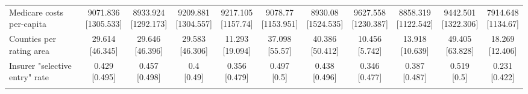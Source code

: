 \begin{tabular}[t]{lcccccccccc}
\addlinespace
Medicare costs per-capita & \makecell[t]{9071.836\\{[}1305.533{]}} & \makecell[t]{8933.924\\{[}1292.173{]}} & \makecell[t]{9209.881\\{[}1304.557{]}} & \makecell[t]{9217.105\\{[}1157.74{]}} & \makecell[t]{9078.77\\{[}1153.951{]}} & \makecell[t]{8930.08\\{[}1524.535{]}} & \makecell[t]{9627.558\\{[}1230.387{]}} & \makecell[t]{8858.319\\{[}1122.542{]}} & \makecell[t]{9442.501\\{[}1322.306{]}} & \makecell[t]{7914.648\\{[}1134.67{]}}\\
\addlinespace
Counties per rating area & \makecell[t]{29.614\\{[}46.345{]}} & \makecell[t]{29.646\\{[}46.396{]}} & \makecell[t]{29.583\\{[}46.306{]}} & \makecell[t]{11.293\\{[}19.094{]}} & \makecell[t]{37.098\\{[}55.57{]}} & \makecell[t]{40.386\\{[}50.412{]}} & \makecell[t]{10.456\\{[}5.742{]}} & \makecell[t]{13.918\\{[}10.639{]}} & \makecell[t]{49.405\\{[}63.828{]}} & \makecell[t]{18.269\\{[}12.406{]}}\\
\addlinespace
Insurer "selective entry" rate & \makecell[t]{0.429\\{[}0.495{]}} & \makecell[t]{0.457\\{[}0.498{]}} & \makecell[t]{0.4\\{[}0.49{]}} & \makecell[t]{0.356\\{[}0.479{]}} & \makecell[t]{0.497\\{[}0.5{]}} & \makecell[t]{0.438\\{[}0.496{]}} & \makecell[t]{0.346\\{[}0.477{]}} & \makecell[t]{0.387\\{[}0.487{]}} & \makecell[t]{0.519\\{[}0.5{]}} & \makecell[t]{0.231\\{[}0.422{]}}\\
\addlinespace

\end{tabular}
